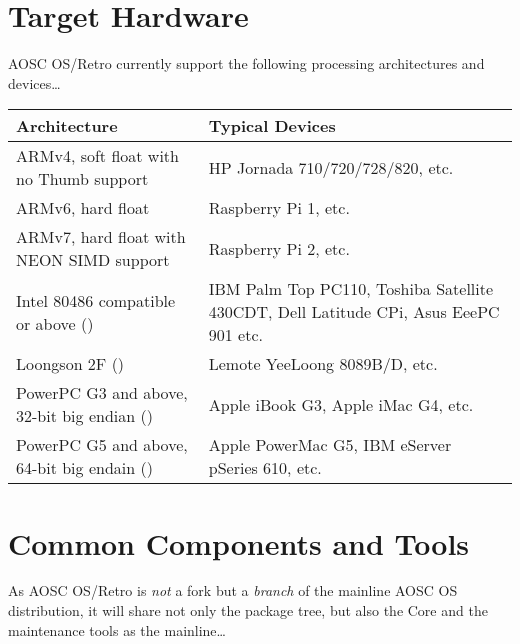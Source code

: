     \section{Target Hardware}
    
    AOSC OS/Retro currently support the following processing architectures and devices\ldots
    \pagebreak

    \begin{tabu} {XX}
        \hline
        {Architecture} &
        {Typical Devices}\\
        \hline
        {ARMv4, soft float with no Thumb support}
            & {HP Jornada 710/720/728/820, etc.}\\
        {ARMv6, hard float}
            & {Raspberry Pi 1, etc.}\\
        {ARMv7, hard float with NEON SIMD support}
            & {Raspberry Pi 2, etc.}\\
        {Intel 80486 compatible or above ()}
            & {IBM Palm Top PC110, Toshiba Satellite 430CDT, Dell Latitude CPi, Asus EeePC 901 etc.}\\
        {Loongson 2F ()}
            & {Lemote YeeLoong 8089B/D, etc.}\\
        {PowerPC G3 and above, 32-bit big endian ()}
            & {Apple iBook G3, Apple iMac G4, etc.}\\
        {PowerPC G5 and above, 64-bit big endain ()}
            & {Apple PowerMac G5, IBM eServer pSeries 610, etc.}\\
        \hline
    \end{tabu}

    \section{Common Components and Tools}
    
    As AOSC OS/Retro is \textit{not} a fork but a \textit{branch} of the mainline AOSC OS distribution,
    it will share not only the package tree, but also the Core and the maintenance tools as the mainline\ldots
    
